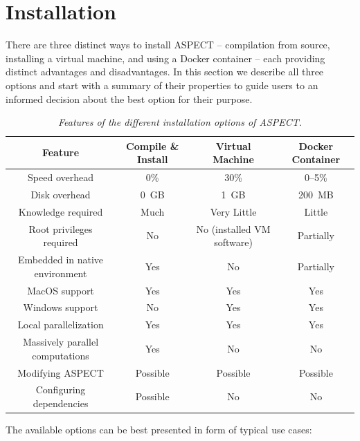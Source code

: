 \documentclass{article}
\newcommand{\aspect}{\textsc{ASPECT}}
\begin{document}
\section{Installation}
\label{sec:installation}

There are three distinct ways to install ASPECT -- compilation
from source, installing a virtual machine, and using a Docker container --
each providing distinct advantages and disadvantages. In this section we
describe all three options and start with a summary of their properties to
guide users to an informed decision about the best option for their purpose.

\begin{table}[htb]
  \center
  \begin{tabular}{|c|ccc|}
    \hline
    Feature & Compile \& Install & Virtual Machine & Docker Container \\
    \hline
    Speed overhead          & 0\%   & 30\%     & 0--5\%    \\
    Disk overhead           & 0~GB  & 1~GB     & 200~MB       \\
    Knowledge required      & Much  & Very Little & Little    \\
    Root privileges required & No   & No (installed VM software) & Partially  \\
    Embedded in native environment & Yes & No  & Partially    \\
    MacOS support           & Yes   & Yes      & Yes    \\
    Windows support         & No    & Yes      & Yes    \\
    Local parallelization   & Yes   & Yes      & Yes            \\
    Massively parallel computations & Yes & No & No \\
    Modifying ASPECT        & Possible & Possible & Possible \\
    Configuring dependencies & Possible & No   & No \\ \hline
  \end{tabular}
  \caption{\it Features of the different installation options of \aspect{}.}
  \label{tab:install-options}
\end{table}

The available options can be best presented in form of typical use cases:
\end{document}
